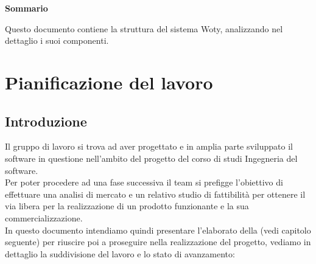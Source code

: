 
\newpage

\vspace*{0.5cm} %
\begin{center}

\textbf{{\huge{Sommario}}}

Questo documento contiene la struttura del sistema Woty, analizzando nel dettaglio i suoi componenti.

\vspace*{0.2cm} %

\end{center}






\newpage

\tableofcontents %

\let\cleardoublepage\clearpage %

\listoftables

\listoffigures




\newpage
\section{Pianificazione del lavoro}

\subsection{Introduzione}
Il gruppo di lavoro si trova ad aver progettato e in amplia parte sviluppato il software in questione nell'ambito del progetto del corso di studi Ingegneria del software. \\Per poter procedere ad una fase successiva il team si prefigge l'obiettivo di effettuare una analisi di mercato e un relativo studio di fattibilità per ottenere il via libera per la realizzazione di un prodotto funzionante e la sua commercializzazione.\\In questo documento intendiamo quindi presentare l'elaborato della  (vedi capitolo seguente) per riuscire poi a proseguire nella realizzazione del progetto, vediamo in dettaglio la suddivisione del lavoro e lo stato di avanzamento:

